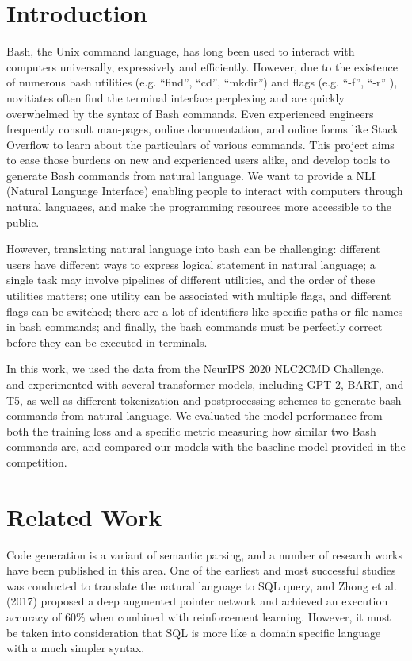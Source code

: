 \section{Introduction}
Bash, the Unix command language, has long been used to interact with computers
universally, expressively and efficiently.  However, due to the existence of
numerous bash utilities (e.g. ``find'', ``cd'', ``mkdir'') and flags (e.g.
``-f'', ``-r'' ), novitiates often find the terminal interface perplexing and
are quickly overwhelmed by the syntax of Bash commands. Even experienced
engineers frequently consult man-pages, online documentation, and online forms
like Stack Overflow to learn about the particulars of various commands. This
project aims to ease those burdens on new and experienced users alike, and
develop tools to generate Bash commands from natural language. We want to
provide a NLI (Natural Language Interface) enabling people to interact with
computers through natural languages, and make the programming resources more
accessible to the public.

However, translating natural language into bash can be challenging: different
users have different ways to express logical statement in natural language; a
single task may involve pipelines of different utilities, and the order of
these utilities matters; one utility can be associated with multiple flags, and
different flags can be switched; there are a lot of identifiers like specific
paths or file names in bash commands; and finally, the bash commands must be perfectly correct before
they can be executed in terminals.

In this work, we used the data from the NeurIPS 2020 NLC2CMD Challenge, and
experimented with several transformer models, including GPT-2, BART, and T5, as
well as different tokenization and postprocessing schemes to generate bash
commands from natural language. We evaluated the model performance from both
the training loss and a specific metric measuring how similar two Bash commands
are, and compared our models with the baseline model provided in the
competition.


\section{Related Work}
Code generation is a variant of semantic parsing, and a number of research
works have been published in this area. One of the earliest and most successful
studies was conducted to translate the natural language to SQL query, and Zhong
et al. (2017) \cite{zhong2017seq2sql} proposed a deep augmented pointer network
and achieved an execution accuracy of 60\% when combined with reinforcement
learning. However, it must be taken into consideration that SQL is more like a
domain specific language with a much simpler syntax.

